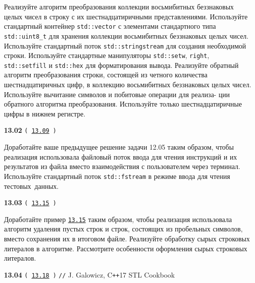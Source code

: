 \documentclass[a4paper,12pt]{article}
\begin{document}
\bigskip

Реализуйте алгоритм преобразования коллекции восьмибитных беззнаковых целых чисел в строку с их шестнадцатиричными представлениями. Используйте стандартный контейнер \lstinline{std::vector} с элементами стандартного типа \lstinline{std::uint8_t} для хранения коллекции восьмибитных беззнаковых целых чисел. Используйте стандартный поток \lstinline{std::stringstream} для создания необходимой строки. Используйте стандартные манипуляторы \lstinline{std::setw}, \lstinline{right}, \lstinline{std::setfill} и \lstinline{std::hex} для форматирования вывода. Реализуйте обратный алгоритм преобразования строки, состоящей из четного количества шестнадцатиричных цифр, в коллекцию восьмибитных беззнаковых целых чисел. Используйте вычитание символов и побитовые операции для реализа- ции обратного алгоритма преобразования. Используйте только шестнадцатиричные цифры в нижнем регистре.  

\bigskip

{\large \textbf{13.02} \texttt{(\,\href{https://github.com/i-s-m-mipt/Education/blob/master/projects/examples/source/13.09.cpp}{13.09}\,)}}

\bigskip

Доработайте ваше предыдущее решение задачи 12.05 таким образом, чтобы реализация использовала файловый поток ввода для чтения инструкций и их результатов из файла вместо взаимодействия с пользователем через терминал. Используйте стандартный поток \lstinline{std::fstream} в режиме ввода для чтения тестовых~данных.

\bigskip

{\large \textbf{13.03} \texttt{(\,\href{https://github.com/i-s-m-mipt/Education/blob/master/projects/examples/source/13.15.cpp}{13.15}\,)}}

\bigskip

Доработайте пример \href{https://github.com/i-s-m-mipt/Education/blob/master/projects/examples/source/13.15.cpp}{\texttt{13.15}} таким образом, чтобы реализация использовала алгоритм удаления пустых строк и строк, состоящих из пробельных символов, вместо сохранения их в итоговом файле. Реализуйте обработку сырых строковых литералов в алгоритме. Рассмотрите особенности оформления сырых строковых литералов.

\bigskip

{\large \textbf{13.04} \texttt{(\,\href{https://github.com/i-s-m-mipt/Education/blob/master/projects/examples/source/13.18.cpp}{13.18}\,)} \texttt{//} J. Galowicz, C\texttt{++}17 STL Cookbook}
\end{document}
